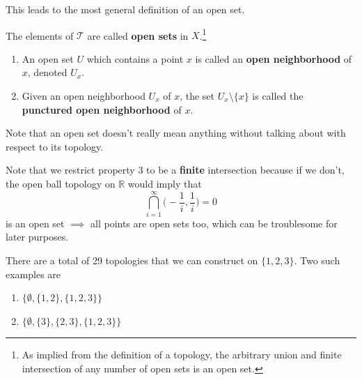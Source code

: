 \documentclass{article}
\begin{document}
    This leads to the most general definition of an open set. 

    \begin{definition}
      The elements of $\mathscr{T}$ are called \textbf{open sets} in $X$.\footnote{As implied from the definition of a topology, the arbitrary union and finite intersection of any number of open sets is an open set.} 
      \begin{enumerate}
        \item An open set $U$ which contains a point $x$ is called an \textbf{open neighborhood} of $x$, denoted $U_x$. 
        \item Given an open neighborhood $U_x$ of $x$, the set $U_x \setminus \{x\}$ is called the \textbf{punctured open neighborhood} of $x$. 
      \end{enumerate}
    \end{definition}

    Note that an open set doesn't really mean anything without talking about with respect to its topology. 

    Note that we restrict property 3 to be a \textbf{finite} intersection because if we don't, the open ball topology on $\mathbb{R}$ would imply that 
    \begin{equation}
      \bigcap_{i = 1}^{\infty} \Big( - \frac{1}{i}, \frac{1}{i} \Big) = 0
    \end{equation}
    is an open set $\implies$ all points are open sets too, which can be troublesome for later purposes. 

    \begin{example}
      There are a total of 29 topologies that we can construct on $\{1, 2, 3\}$. Two such examples are 
      \begin{enumerate}
        \item $\{\emptyset, \{1, 2\}, \{1, 2, 3\}\}$ 
        \item $\{\emptyset, \{3\}, \{2, 3\}, \{1, 2, 3\}\}$
      \end{enumerate}
    \end{example} 
\end{document}
